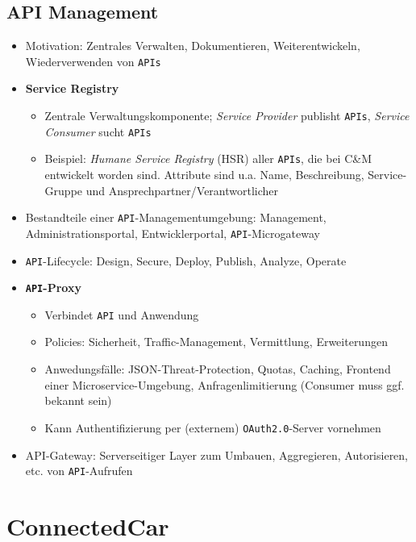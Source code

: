 \subsection{API Management}
\begin{itemize}
	\item Motivation: Zentrales Verwalten, Dokumentieren, Weiterentwickeln, Wiederverwenden von \texttt{APIs}
	\item \textbf{Service Registry}
	\begin{itemize}
		\item Zentrale Verwaltungskomponente; \textit{Service Provider} publisht \texttt{APIs}, \textit{Service Consumer} sucht \texttt{APIs}
		\item Beispiel: \textit{Humane Service Registry} (HSR) aller \texttt{APIs}, die bei C\&M entwickelt worden sind. Attribute sind u.a. Name, Beschreibung, Service-Gruppe und Ansprechpartner/Verantwortlicher
	\end{itemize}
	\item Bestandteile einer \texttt{API}-Managementumgebung: Management, Administrationsportal, Entwicklerportal, \texttt{API}-Microgateway
	\item \texttt{API}-Lifecycle: Design, Secure, Deploy, Publish, Analyze, Operate
	\item \textbf{\texttt{API}-Proxy}
	\begin{itemize}
		\item Verbindet \texttt{API} und Anwendung
		\item Policies: Sicherheit, Traffic-Management, Vermittlung, Erweiterungen
		\item Anwedungsfälle: JSON-Threat-Protection, Quotas, Caching, Frontend einer Microservice-Umgebung, Anfragenlimitierung (Consumer muss ggf. bekannt sein)
		\item Kann Authentifizierung per (externem) \texttt{OAuth2.0}-Server vornehmen
	\end{itemize}
	\item {API}-Gateway: Serverseitiger Layer zum Umbauen, Aggregieren, Autorisieren, etc. von \texttt{API}-Aufrufen
\end{itemize}



\section{ConnectedCar}


